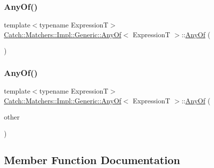 \subsubsection{\texorpdfstring{Any\+Of()}{AnyOf()}\hspace{0.1cm}{\footnotesize\ttfamily [1/2]}}
{\footnotesize\ttfamily template$<$typename ExpressionT$>$ \\
\hyperlink{class_catch_1_1_matchers_1_1_impl_1_1_generic_1_1_any_of}{Catch\+::\+Matchers\+::\+Impl\+::\+Generic\+::\+Any\+Of}$<$ ExpressionT $>$\+::\hyperlink{class_catch_1_1_matchers_1_1_impl_1_1_generic_1_1_any_of}{Any\+Of} (\begin{DoxyParamCaption}{ }\end{DoxyParamCaption})\hspace{0.3cm}{\ttfamily [inline]}}

\hypertarget{class_catch_1_1_matchers_1_1_impl_1_1_generic_1_1_any_of_a74fbc05b32d334fcbfd0fae0163a404e}{}\label{class_catch_1_1_matchers_1_1_impl_1_1_generic_1_1_any_of_a74fbc05b32d334fcbfd0fae0163a404e} 
\subsubsection{\texorpdfstring{Any\+Of()}{AnyOf()}\hspace{0.1cm}{\footnotesize\ttfamily [2/2]}}
{\footnotesize\ttfamily template$<$typename ExpressionT$>$ \\
\hyperlink{class_catch_1_1_matchers_1_1_impl_1_1_generic_1_1_any_of}{Catch\+::\+Matchers\+::\+Impl\+::\+Generic\+::\+Any\+Of}$<$ ExpressionT $>$\+::\hyperlink{class_catch_1_1_matchers_1_1_impl_1_1_generic_1_1_any_of}{Any\+Of} (\begin{DoxyParamCaption}\item[{\hyperlink{class_catch_1_1_matchers_1_1_impl_1_1_generic_1_1_any_of}{Any\+Of}$<$ ExpressionT $>$ const \&}]{other }\end{DoxyParamCaption})\hspace{0.3cm}{\ttfamily [inline]}}



\subsection{Member Function Documentation}
\hypertarget{class_catch_1_1_matchers_1_1_impl_1_1_generic_1_1_any_of_a3bce94b627551e5f96c5f9c6060413f0}{}\label{class_catch_1_1_matchers_1_1_impl_1_1_generic_1_1_any_of_a3bce94b627551e5f96c5f9c6060413f0} 
